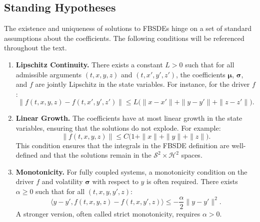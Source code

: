 \subsection*{Standing Hypotheses}
The existence and uniqueness of solutions to FBSDEs hinge on a set of standard assumptions about the coefficients. The following conditions will be referenced throughout the text.

\begin{assumption}
\label{def:standing_hypotheses}
\begin{enumerate}[label=(H\arabic*), leftmargin=1.5cm]
\item\label{H1} \textbf{Lipschitz Continuity.} There exists a constant \(L>0\) such that for all admissible arguments \((t,x,y,z)\) and \((t,x',y',z')\), the coefficients \(\bm\mu\), \(\bm\sigma\), and \(f\) are jointly Lipschitz in the state variables. For instance, for the driver \(f\):
      \[
        \|f(t,x,y,z)-f(t,x',y',z')\|
          \le L\bigl(\|x-x'\|+\|y-y'\|+\|z-z'\|\bigr).
      \]
\item\label{H2} \textbf{Linear Growth.} The coefficients have at most linear growth in the state variables, ensuring that the solutions do not explode. For example:
      \[
        \|f(t,x,y,z)\| \le C\bigl(1+\|x\|+\|y\|+\|z\|\bigr).
      \]
      This condition ensures that the integrals in the FBSDE definition are well-defined and that the solutions remain in the \(\mathcal{S}^2 \times \mathcal{H}^2\) spaces.
\item\label{H3} \textbf{Monotonicity.} For fully coupled systems, a monotonicity condition on the driver \(f\) and volatility \(\bm\sigma\) with respect to \(y\) is often required. There exists \(\alpha \ge 0\) such that for all \((t,x,y,y',z)\):
      \[
        \langle y-y', f(t,x,y,z)-f(t,x,y',z)\rangle
        \le -\frac{\alpha}{2}\|y-y'\|^2.
      \]
      A stronger version, often called strict monotonicity, requires \(\alpha > 0\).
\end{enumerate}
\end{assumption}

